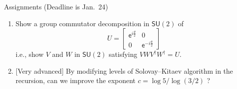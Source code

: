 \documentclass{beamer}
\begin{document}
\begin{frame}{Assignments (Deadline is Jan.\ 24)}
\small
\begin{enumerate}
\setlength{\itemsep}{2em}
\item Show a group commutator decomposition in $\mathsf{SU}(2)$ of
\begin{equation*}
U =
\begin{bmatrix}
\mathsf{e}^{i\frac{\theta}2} & 0\\
0 & \mathsf{e}^{-i\frac{\theta}2}
\end{bmatrix}
\end{equation*}
i.e., show $V$ and $W$ in $\mathsf{SU}(2)$ satisfying $VWV^\dagger W^\dagger = U$.
\item {[Very advanced]} By modifying levels of Solovay--Kitaev algorithm in the recursion, can we improve the exponent $c=\log 5 / \log(3/2)$ ?
\end{enumerate}
\end{frame}
\end{document}
